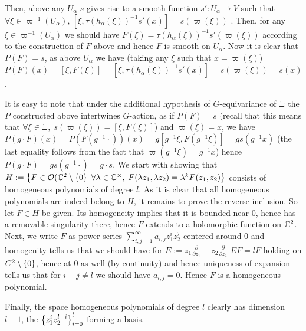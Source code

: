 \documentclass[8pt]{article} %
\begin{document}
	Then, above any $U_\alpha$ $s$ gives rise to a smooth function $s':U_\alpha\to V$ such that $\forall \xi\in \varpi^{ -1 }
	(U_\alpha)$,
	$[\xi,\tau(h_\alpha(\xi))^{ -1 }s'(x)]=s(\varpi(\xi))$
	. Then, for any $\xi\in\varpi^{ -1 }(U_\alpha)$ we should have
	$F(\xi)=\tau(h_\alpha(\xi))^{ -1 } 
	s'(\varpi(\xi))$ according to the construction of $F$ above and hence $F$ is smooth on $U_\alpha$.
	Now it is clear that $P(F)=s$, as above $U_\alpha$ we have (taking any $\xi$ such that $x=\varpi(\xi)$)
	$P(F)(x)=[\xi,F(\xi)]=[\xi,\tau(h_\alpha(\xi))^{ -1 }s'(x)]=
	s(\varpi(\xi))=s(x)$.\par
 	It is easy to note that under the additional hypothesis of $G$-equivariance of $\Xi$ the $P$ constructed
	above intertwines $G$-action, as if $P(F)=s$ (recall that this means that $\forall \xi\in\Xi,\;s(\varpi(\xi))=[\xi,F(\xi)]
	$)
	and $\varpi(\xi)=x$, we have $P(g\cdot F)(x)=P(F(g^{ -1 }\cdot))(x)=
	g[g^{ -1 }\xi,F(g^{ -1 }\xi)]=gs(g^{ -1 }x)$ (the last equality follows from the fact that $\varpi(g^{ -1 }\xi)=g^{ -1 }x$)
	hence $P(g\cdot F)=gs(g^{ -1 }\cdot)=g\cdot s$.
We start with showing that 
$H:=\left\{ F\in\mathcal{ O }(\mathbb{C}^2\setminus\left\{ 0 \right\} \big| \forall\lambda\in\mathbb{C}^\times,\;F(\lambda z_1,\lambda z_2)=\lambda^{ k }F(z_1,z_2)\right\}$ consists of homogeneous polynomials of
	degree $l$.
	As it is clear that all homogeneous polynomials are indeed belong to $H$, it remains to prove the reverse inclusion.
	So let $F\in H$ be given. Its homogeneity implies that it is bounded near $0$, hence has a removable singularity there,
	hence $F$ extends to a holomorphic function on $\mathbb{C}^2$. Next, we write $F$ as power series $\sum_{ i,j=1 }^{ \infty }
	a_{ i,j }z_1^iz_2^j$
	centered around $0$ and
	homogenity tells us that we should have for $E:=z_1\frac{ \partial }{ \partial z_1 }+z_2\frac{ \partial }{ \partial z_2 }$
	$EF=lF$ holding on $C^2\setminus\left\{ 0 \right\}$, hence at $0$ as well (by continuity)
	and hence uniqueness of expansion tells us that
	for $i+j\neq l$ we should have $a_{ i,j }=0$. Hence $F$ is a homogeneous polynomial.\par
	Finally, the space homogeneous polynomials of degree $l$ clearly has dimension $l+1$, the $\left\{ z_1^iz_2^{ l-i } \right\}_{ i=0 }
	^l$ forming a basis.
\end{document}
